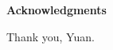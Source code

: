 \thispagestyle{empty}
\vspace*{1cm}

\begin{center}
  \LARGE \textbf{Acknowledgments}
\end{center}


\vspace*{0.5cm}

\noindent 
Thank you, Yuan.
